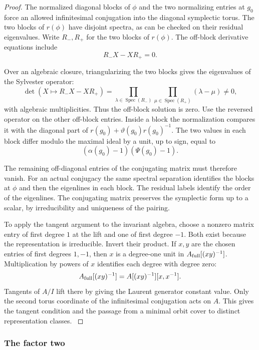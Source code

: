 \begin{proof}
The normalized diagonal blocks of \(\phi\) and the two
normalizing entries at \(g_0\) force an allowed infinitesimal
conjugation into the diagonal symplectic torus. The two blocks of
\(r(\phi)\) have disjoint spectra, as can be checked on their
residual eigenvalues. Write \(R_-,R_+\) for the two blocks of \(r(\phi)\). The
off-block derivative equations include
\[
 R_-X-XR_+=0.
\]

Over an algebraic closure, triangularizing the two blocks gives the eigenvalues of the Sylvester operator:
\[
 \det(X\mapsto R_-X-XR_+)
 =\prod_{\lambda\in\operatorname{Spec}(R_-)}
   \prod_{\mu\in\operatorname{Spec}(R_+)}(\lambda-\mu)\ne0 ,
\]
with algebraic multiplicities. Thus the off-block solution is zero. Use the reversed
operator on the other off-block entries. Inside a block the normalization
compares it with the diagonal part of
\(r(g_0)+\vartheta(g_0)r(g_0)^{-1}\). The two values in
each block differ modulo the maximal ideal by a unit, up to
sign, equal to
\[
 (\alpha(g_0)-1)(\Psi(g_0)-1).
\]

The remaining off-diagonal entries of the conjugating matrix
must therefore vanish. For an actual conjugacy the same
spectral separation identifies the blocks at \(\phi\)
and then the eigenlines in each block. The residual labels
identify the order of the eigenlines. The conjugating matrix
preserves the symplectic form up to a scalar, by irreducibility
and uniqueness of the pairing.

To apply the tangent argument to the invariant algebra,
choose a nonzero matrix entry of first degree \(1\) at the
lift and one of first degree \(-1\). Both exist because
the representation is irreducible. Invert their product.
If \(x,y\) are the chosen entries of first degrees \(1,-1\),
then \(x\) is a degree-one unit in \(A_{\rm full}[(xy)^{-1}]\).
Multiplication by powers of \(x\) identifies each degree with
degree zero:
\[
       A_{\rm full}[(xy)^{-1}]=A[(xy)^{-1}][x,x^{-1}].
\] Tangents of \(A/I\) lift
there by giving the Laurent generator constant value.
Only the second torus coordinate of the infinitesimal
conjugation acts on \(A\). This gives the tangent condition
and the passage from a minimal orbit cover to distinct
representation classes.
\label{cor:ordinary-symplectic-cohomology-15}

\end{proof}

\subsubsection{The factor two}

